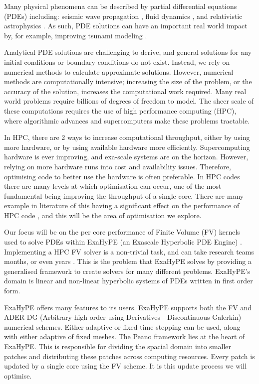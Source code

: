 Many physical phenomena can be described by partial differential equations (PDEs) including:  seismic wave propagation \cite{earthquakePDE}, fluid dynamics \cite{exahype}, and relativistic astrophysics \cite{relativisticPDE}.
As such, PDE solutions can have an important real world impact by, for example, improving tsunami modeling \cite{tsunamiPDE}.


Analytical PDE solutions are challenging to derive, and general solutions for any initial conditions or boundary conditions do not exist.
Instead, we rely on numerical methods to calculate approximate solutions.
However, numerical methods are computationally intensive; increasing the size of the problem, or the accuracy of the solution, increases the computational work required.
Many real world problems require billions of degrees of freedom to model.
The sheer scale of these computations requires the use of high performance computing (HPC), where algorithmic advances and supercomputers make these problems tractable.

In HPC, there are 2 ways to increase computational throughput, either by using more hardware, or by using available hardware more efficiently.
Supercomputing hardware is ever improving, and exa-scale systems are on the horizon.
However, relying on more hardware runs into cost and availability issues.
Therefore, optimising code to better use the hardware is often preferable.
In HPC codes there are many levels at which optimisation can occur, one of the most fundamental being improving the throughput of a single core.
There are many example in literature of this having a significant effect on the performance of HPC code \cite{YATeTo,seisolPFLOP,codegen_dg_SIMD}, and this will be the area of optimisation we explore.     

Our focus will be on the per core performance of Finite Volume (FV) kernels used to solve PDEs within ExaHyPE (an Exascale Hyperbolic PDE Engine) \cite{exahype}.
Implementing a HPC FV solver is a non-trivial task, and can take research teams months, or even years \cite{tensorChemistry}.
This is the problem that ExaHyPE solves by providing a generalised framework to create solvers for many different problems.
ExaHyPE's domain is linear and non-linear hyperbolic systems of PDEs written in first order form.

ExaHyPE offers many features to its users.
ExaHyPE supports both the FV and ADER-DG (Arbitrary high-order using Derivatives - Discontinuous Galerkin) numerical schemes.
Either adaptive or fixed time stepping can be used, along with either adaptive of fixed meshes.
The Peano framework \cite{PeanoFramework} lies at the heart of ExaHyPE.
This is responsible for dividing the spacial domain into smaller patches and distributing these patches across computing resources.
Every patch is updated by a single core using the FV scheme.
It is this update process we will optimise.

